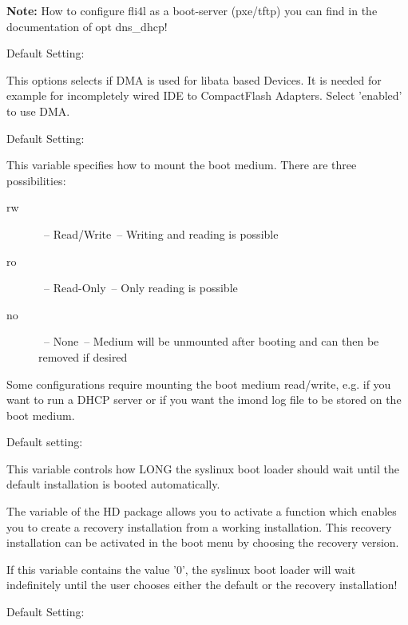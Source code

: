 \begin{description}
   \textbf{Note:} How to configure fli4l as a boot-server (pxe/tftp) you 
    can find in the documentation of opt dns\_dhcp!
  
  
  Default Setting: 

  This options selects if DMA is used for libata based Devices. It is needed 
  for example for incompletely wired IDE to CompactFlash Adapters. Select
  'enabled' to use DMA.

  
  Default Setting: 
  
  {This variable specifies how to mount the boot medium. There are three
  possibilities:

    \begin{description}
    \item[rw]~-- Read/Write~-- Writing and reading is possible
    \item[ro]~-- Read-Only~-- Only reading is possible
    \item[no]~-- None~-- Medium will be unmounted after booting and can then
      be removed if desired
    \end{description}

    Some configurations require mounting the boot medium read/write, e.g. if
    you want to run a DHCP server or if you want the imond log file to be
    stored on the boot medium.}


  Default setting: 

  {This variable controls how LONG the syslinux boot loader should wait
   until the default installation is booted automatically.

    The  variable of the HD package allows you to activate
    a function which enables you to create a recovery installation from a
    working installation. This recovery installation can be activated in the
    boot menu by choosing the recovery version.

    If this variable contains the value '0', the syslinux boot loader will
    wait indefinitely until the user chooses either the default or the
    recovery installation!}

  
  Default Setting: 


\end{description}
